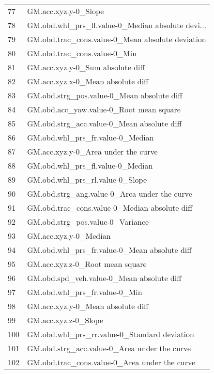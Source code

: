 \begin{tabular}{ll}
77  &                               GM.acc.xyz.y-0\_Slope \\
78  &  GM.obd.whl\_prs\_fl.value-0\_Median absolute devi... \\
79  &   GM.obd.trac\_cons.value-0\_Mean absolute deviation \\
80  &                       GM.obd.trac\_cons.value-0\_Min \\
81  &                   GM.acc.xyz.y-0\_Sum absolute diff \\
82  &                  GM.acc.xyz.x-0\_Mean absolute diff \\
83  &         GM.obd.strg\_pos.value-0\_Mean absolute diff \\
84  &            GM.obd.acc\_yaw.value-0\_Root mean square \\
85  &         GM.obd.strg\_acc.value-0\_Mean absolute diff \\
86  &                   GM.obd.whl\_prs\_fr.value-0\_Median \\
87  &                GM.acc.xyz.y-0\_Area under the curve \\
88  &                   GM.obd.whl\_prs\_fl.value-0\_Median \\
89  &                    GM.obd.whl\_prs\_rl.value-0\_Slope \\
90  &       GM.obd.strg\_ang.value-0\_Area under the curve \\
91  &      GM.obd.trac\_cons.value-0\_Median absolute diff \\
92  &                   GM.obd.strg\_pos.value-0\_Variance \\
93  &                              GM.acc.xyz.y-0\_Median \\
94  &       GM.obd.whl\_prs\_fr.value-0\_Mean absolute diff \\
95  &                    GM.acc.xyz.z-0\_Root mean square \\
96  &          GM.obd.spd\_veh.value-0\_Mean absolute diff \\
97  &                      GM.obd.whl\_prs\_fr.value-0\_Min \\
98  &                  GM.acc.xyz.y-0\_Mean absolute diff \\
99  &                               GM.acc.xyz.z-0\_Slope \\
100 &       GM.obd.whl\_prs\_rr.value-0\_Standard deviation \\
101 &       GM.obd.strg\_acc.value-0\_Area under the curve \\
102 &      GM.obd.trac\_cons.value-0\_Area under the curve \\

\end{tabular}
